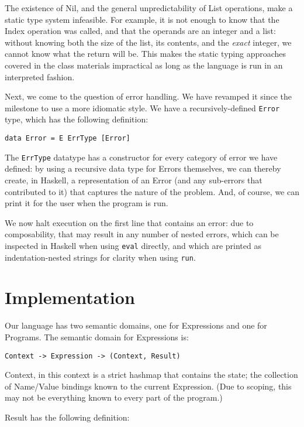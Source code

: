 \documentclass{article}
\begin{document}
The existence of Nil, and the general unpredictability of List operations, make a static type system infeasible.  For example, it is not enough to know that the Index operation was called, and that the operands are an integer and a list: without knowing both the size of the list, its contents, and the \emph{exact} integer, we cannot know what the return will be.  This makes the static typing approaches covered in the class materials impractical as long as the language is run in an interpreted fashion.

Next, we come to the question of error handling.  We have revamped it since the milestone to use a more idiomatic style.  We have a recursively-defined \texttt{Error} type, which has the following definition:

\begin{lstlisting}
data Error = E ErrType [Error]
\end{lstlisting}

The \texttt{ErrType} datatype has a constructor for every category of error we have defined: by using a recursive data type for Errors themselves, we can thereby create, in Haskell, a representation of an Error (and any sub-errors that contributed to it) that captures the nature of the problem.  And, of course, we can print it for the user when the program is run.

We now halt execution on the first line that contains an error: due to composability, that may result in any number of nested errors, which can be inspected in Haskell when using \texttt{eval} directly, and which are printed as indentation-nested strings for clarity when using \texttt{run}.

\section*{Implementation}

Our language has two semantic domains, one for Expressions and one for Programs.  The semantic domain for Expressions is:

\begin{lstlisting}
Context -> Expression -> (Context, Result)
\end{lstlisting}

Context, in this context is a strict hashmap that contains the state; the collection of Name/Value bindings known to the current Expression.  (Due to scoping, this may not be everything known to every part of the program.)

Result has the following definition:
\end{document}

